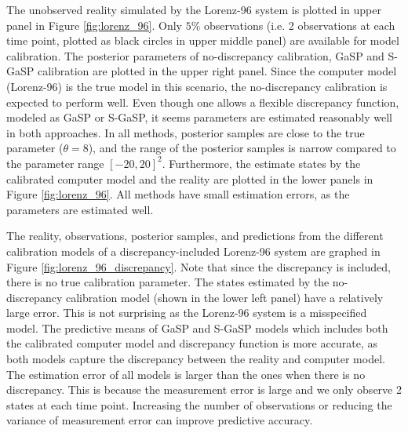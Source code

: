  


 The unobserved reality simulated by the Lorenz-96 system is plotted in upper  panel in Figure \ref{fig:lorenz_96}.  Only $5\%$ observations  (i.e. 2 observations at each time point, plotted as black circles in upper middle panel) are available for model calibration. The posterior parameters of no-discrepancy calibration, GaSP and S-GaSP calibration are plotted in the upper right panel. Since the computer model (Lorenz-96) is the true model {in this scenario,} the no-discrepancy calibration is expected to perform well. Even though one allows a flexible discrepancy function, modeled as GaSP or S-GaSP, it seems parameters are estimated reasonably well in both approaches.  In all methods, posterior samples are close to the true parameter ($\theta=8$), and the range of the posterior samples is  narrow compared to the parameter range $[-20, 20]^2$. Furthermore, the estimate states by the calibrated computer model and the reality are plotted in the lower panels in Figure \ref{fig:lorenz_96}. All methods have small estimation errors, as the parameters are estimated well. 


The reality, observations, posterior samples, and predictions from the different calibration models of a discrepancy-included Lorenz-96 system are graphed in Figure \ref{fig:lorenz_96_discrepancy}. Note that since the discrepancy is included, there is no true calibration parameter.  The states estimated by the no-discrepancy calibration model (shown in the lower left panel) have {a} relatively large error. This is not surprising as the Lorenz-96 system is a misspecified model. The predictive means of GaSP and S-GaSP models which includes both the calibrated computer model and discrepancy function is more accurate, as both models capture the discrepancy between the reality and computer model.  The estimation error of all models is larger than the ones when there is no discrepancy. This is because the measurement error is large and we only observe 2 states at each time point. Increasing the number of observations or reducing the variance of measurement error can improve predictive accuracy. 

